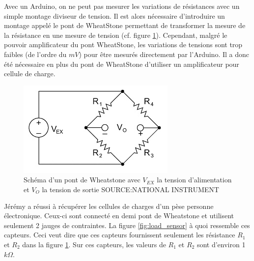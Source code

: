 \documentclass{polytech/polytech}
\begin{document}
Avec un Arduino, on ne peut pas mesurer les variations de résistances avec un simple montage diviseur de tension. Il est alors nécessaire d'introduire un montage appelé le pont de WheatStone permettant de transformer la mesure de la résistance en une mesure de tension (cf. figure \ref{fig:wheatstone_bridge}). Cependant, malgré le pouvoir amplificateur
du pont WheatStone, les variations de tensions sont trop faibles (de l'ordre du $mV$) pour être mesurés directement par l'Arduino. Il a donc été nécessaire en plus du pont de WheatStone d'utiliser un amplificateur pour cellule de charge.

\begin{figure}
\begin{center}
\includegraphics[scale=1]{image/wheatstone_bridge.jpg}
\end{center}
\caption{Schéma d'un pont de Wheatstone avec $V_{EX}$ la tension d'alimentation et $V_O$ la tension de sortie SOURCE:NATIONAL INSTRUMENT}
\label{fig:wheatstone_bridge}
\end{figure}

Jérémy a réussi à récupérer les cellules de charges d'un pèse personne électronique. Ceux-ci sont connecté en demi pont de Wheatstone et utilisent seulement 2 jauges de contraintes. La figure \ref{fig:load_sensor} à quoi ressemble ces capteurs. Ceci veut dire que ces capteurs fournissent seulement les résistance $R_1$ et $R_2$ dans la figure \ref{fig:wheatstone_bridge}. Sur ces capteurs, les valeurs  de $R_1$ et $R_2$ sont d'environ 1$k\Omega$.
\end{document}
